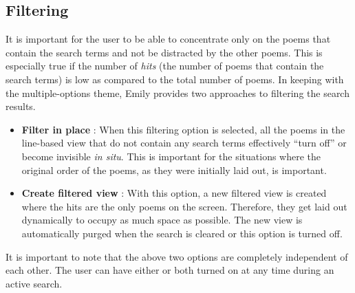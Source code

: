 \documentclass[10pt, twocolumn]{article}
\begin{document}
\subsection{Filtering}\label{sec:filter}
It is important for the user to be able to concentrate only on the poems that contain the search terms and not be distracted by the other poems. This is especially true if the number of \textit{hits} (the number of poems that contain the search terms) is low as compared to the total number of poems. In keeping with the multiple-options theme, Emily provides two approaches to filtering the search results.  
\begin{itemize}
  \item \textbf{Filter in place} : When this filtering option is selected, all the poems in the line-based view that do not contain any search terms effectively ``turn off'' or become invisible \textit{in situ}. This is important for the situations where the original order of the poems, as they were initially laid out, is important. 
  \item \textbf{Create filtered view} : With this option, a new filtered view is created where the hits are the only poems on the screen. Therefore, they get laid out dynamically to occupy as much space as possible. The new view is automatically purged when the search is cleared or this option is turned off. 
\end{itemize}
It is important to note that the above two options are completely independent of each other. The user can have either or both turned on at any time during an active search. 
\end{document}
